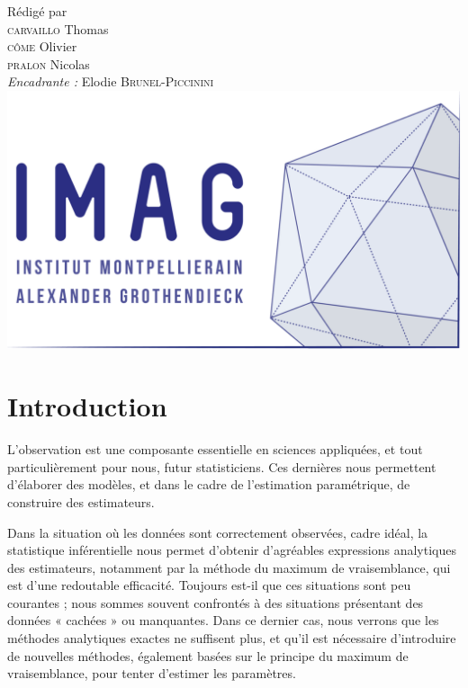 \documentclass[frenchb]{report}
\newcommand{\1}{\mathbbm{1}}
\theoremstyle{definition}\newtheorem{defn}{Définition}
\theoremstyle{definition}\newtheorem{exm}{Exemple}
\theoremstyle{definition}\newtheorem{nota}{Notation}
\theoremstyle{definition}\newtheorem{rem}{Remarque}
\begin{document}
\begin{titlepage}
\begin{center}
{\large Rédigé par\\}
{\Large \textsc{carvaillo} Thomas}\\
{\Large \textsc{côme} Olivier}\\
{\Large \textsc{pralon} Nicolas}\\[1cm]
{\large \emph{Encadrante :} Elodie \textsc{Brunel-Piccinini}}\\[1.5cm] 

\includegraphics[scale=0.7]{imag_logo.png}

\end{center}
\end{titlepage}
\tableofcontents
\newpage

\chapter*{Introduction}
L’observation est une composante essentielle en sciences appliquées, et tout particulièrement pour nous, futur statisticiens. Ces dernières nous permettent d’élaborer des modèles, et dans le cadre de l’estimation paramétrique, de construire des estimateurs.

Dans la situation où les données sont correctement observées, cadre idéal, la statistique inférentielle nous permet d’obtenir d’agréables expressions analytiques des estimateurs, notamment par la méthode du maximum de vraisemblance, qui est d'une redoutable efficacité. Toujours est-il que ces situations sont peu courantes ; nous sommes souvent confrontés à des situations présentant des données « cachées » ou manquantes. Dans ce dernier cas, nous verrons que les méthodes analytiques exactes ne suffisent plus, et qu’il est nécessaire d’introduire de nouvelles méthodes, également 	basées sur le principe du maximum de vraisemblance, pour tenter d’estimer les paramètres.
\end{document}
